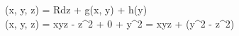 \phi(x, y, z) = \int Rdz + g(x, y) + h(y) \implies\\
\phi(x, y, z) = xyz - z^2 + 0 + y^2 = xyz + (y^2 - z^2)